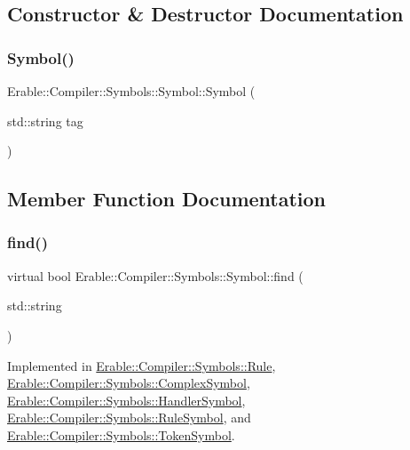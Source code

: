 \subsection{Constructor \& Destructor Documentation}
\mbox{\label{class_erable_1_1_compiler_1_1_symbols_1_1_symbol_ac4118dbed43e0a07dadb08f92bab3c75}} 
\subsubsection{\texorpdfstring{Symbol()}{Symbol()}}
{\footnotesize\ttfamily Erable\+::\+Compiler\+::\+Symbols\+::\+Symbol\+::\+Symbol (\begin{DoxyParamCaption}\item[{std\+::string}]{tag }\end{DoxyParamCaption})\hspace{0.3cm}{\ttfamily [explicit]}}



\subsection{Member Function Documentation}
\mbox{\label{class_erable_1_1_compiler_1_1_symbols_1_1_symbol_ac1d8b1392aef2e93bd47520a86f8617f}} 
\subsubsection{\texorpdfstring{find()}{find()}}
{\footnotesize\ttfamily virtual bool Erable\+::\+Compiler\+::\+Symbols\+::\+Symbol\+::find (\begin{DoxyParamCaption}\item[{std\+::string}]{ }\end{DoxyParamCaption})\hspace{0.3cm}{\ttfamily [pure virtual]}}



Implemented in \mbox{\hyperlink{class_erable_1_1_compiler_1_1_symbols_1_1_rule_a33c0d38a60e6f703fd2d947d32a48504}{Erable\+::\+Compiler\+::\+Symbols\+::\+Rule}}, \mbox{\hyperlink{class_erable_1_1_compiler_1_1_symbols_1_1_complex_symbol_a0b1517a55182a14119c73b4c58192dde}{Erable\+::\+Compiler\+::\+Symbols\+::\+Complex\+Symbol}}, \mbox{\hyperlink{class_erable_1_1_compiler_1_1_symbols_1_1_handler_symbol_a04f772599f70bfad40ccb8b4facd6cb0}{Erable\+::\+Compiler\+::\+Symbols\+::\+Handler\+Symbol}}, \mbox{\hyperlink{class_erable_1_1_compiler_1_1_symbols_1_1_rule_symbol_a7af57723a2a59dbccf8cbe409f019a10}{Erable\+::\+Compiler\+::\+Symbols\+::\+Rule\+Symbol}}, and \mbox{\hyperlink{class_erable_1_1_compiler_1_1_symbols_1_1_token_symbol_ad1946e481bf759d24425afbd869248fd}{Erable\+::\+Compiler\+::\+Symbols\+::\+Token\+Symbol}}.


